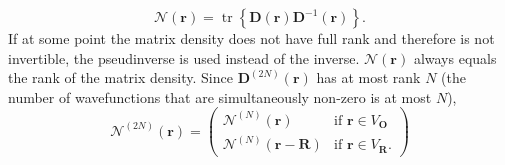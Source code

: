 \documentclass[journal=jpclcd,manuscript=letter]{achemso}
\DeclareMathOperator{\tr}{tr}
\newcommand\m[1]{\mathbf{#1}}
\renewcommand\vec[1]{\mathbf{#1}}
\begin{document}
\begin{equation}
 \mathcal{N}(\vec{r}) = \tr\left\{ \m{D}(\vec{r}) \m{D}^{-1}(\vec{r}) \right\}.
\end{equation}
If at some point the matrix density does not have full rank and therefore is not invertible, the pseudinverse is used instead of the inverse. $\mathcal{N}(\vec{r})$ always equals the rank of the matrix density.
Since $\m{D}^{(2N)}(\vec{r})$ has at most rank $N$ (the number of wavefunctions that are simultaneously non-zero is at most $N$),
\begin{equation}
  \mathcal{N}^{(2N)}(\vec{r})
  =
  \begin{pmatrix}
    \mathcal{N}^{(N)}(\vec{r}) & \text{if } \vec{r} \in V_{\vec{O}} \\
    \mathcal{N}^{(N)}(\vec{r}-\vec{R}) & \text{if } \vec{r} \in V_{\vec{R}}. \label{eqn:N_split}
  \end{pmatrix}
\end{equation}
\end{document}
